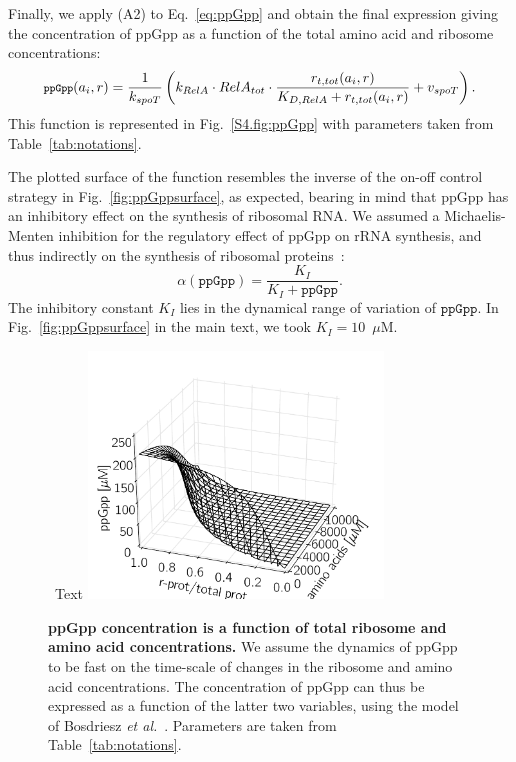 Finally, we apply (A2) to Eq.~\ref{eq:ppGpp} and obtain the final expression giving the concentration of ppGpp as a function of the total amino acid and ribosome concentrations:
\begin{equation}
\footnotesize
\texttt{ppGpp}(a_i, r) = \frac{1}{k_{spoT}} \left( k_{RelA} \cdot RelA_{tot} \cdot \frac{r_{t,tot}(a_i, r)}{K_{D,RelA} + r_{t,tot}(a_i,r)} + v_{spoT} \right).
\end{equation}
This function is represented in Fig.~\ref{S4.fig:ppGpp} with parameters taken from Table~\ref{tab:notations}.

The plotted surface of the function resembles the inverse of the on-off control strategy in Fig.~\ref{fig:ppGppsurface}, as expected, bearing in mind that ppGpp has an inhibitory effect on the synthesis of ribosomal RNA.
We assumed a Michaelis-Menten inhibition for the regulatory effect of ppGpp on rRNA synthesis, and thus indirectly on the synthesis of ribosomal proteins~\cite{potrykus_pppgpp_2008,keener_regulation_1996}:
\begin{equation}
\alpha (\texttt{ppGpp}) = \frac{K_I}{K_I + \texttt{ppGpp}}.
\end{equation}
The inhibitory constant $K_I$ lies in the dynamical range of variation of $\texttt{ppGpp}$.
In Fig.~\ref{fig:ppGppsurface} in the main text, we took $K_I = 10$~$\mu$M.

\begin{figure}[tb]~Text
\centering
\includegraphics[width=0.7\textwidth]{./Fig/FigS4-1}
\caption[ppGpp concentration is a function of total ribosome and amino acid concentrations.]
{
{\bf ppGpp concentration is a function of total ribosome and amino acid concentrations.}\newline
We assume the dynamics of ppGpp to be fast on the time-scale of changes in the ribosome and amino acid concentrations.
The concentration of ppGpp can thus be expressed as a function of the latter two variables, using the model of Bosdriesz \textit{et al.}~\cite{bosdriesz_how_2015}.
Parameters are taken from Table~\ref{tab:notations}.
}
\label{fig:ppGpp}
\end{figure}

